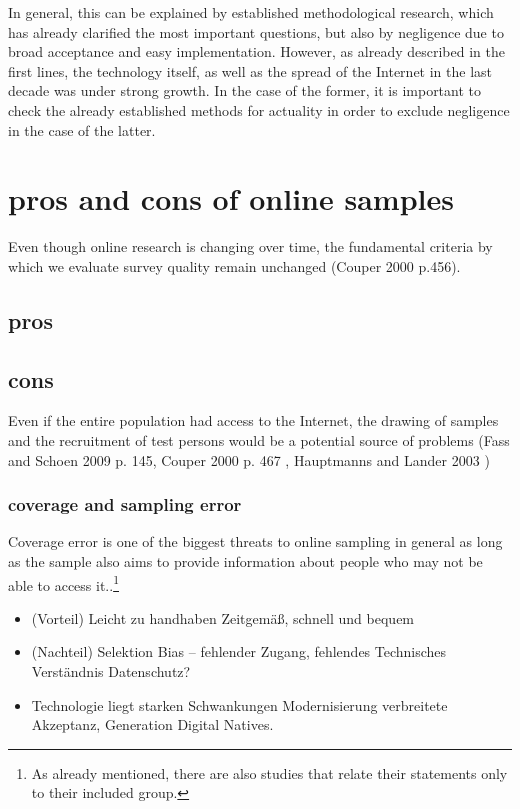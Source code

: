 \documentclass[a4paper , 11pt]{article}
\begin{document}
In general, this can be explained by established methodological research, which has already clarified the most important questions, but also by negligence due to broad acceptance and easy implementation.
However, as already described in the first lines, the technology itself, as well as the spread of the Internet in the last decade was under strong growth. In the case of the former, it is important to check the already established methods for actuality in order to exclude negligence in the case of the latter. 

\section{pros and cons of online samples}

Even though online research is changing over time, the fundamental criteria by which we evaluate survey quality remain unchanged (Couper 2000 p.456).

\subsection{pros}

\subsection{cons}
Even if the entire population had access to the Internet, the drawing of samples and the recruitment of test persons would be a potential source of problems (Fass and Schoen 2009 p. 145, Couper 2000 p. 467 , Hauptmanns and Lander 2003 )
\subsubsection{coverage and sampling error}
Coverage error is one of the biggest threats to online sampling in general as long as the sample also aims to provide information about people who may not be able to access it..\footnote{As already mentioned, there are also studies that relate their statements only to their included group.}

\begin{itemize}

\item (Vorteil) Leicht zu handhaben Zeitgemäß, schnell und bequem
\item (Nachteil) Selektion Bias – fehlender Zugang, fehlendes Technisches Verständnis Datenschutz?
\item Technologie liegt starken Schwankungen Modernisierung verbreitete Akzeptanz, Generation Digital Natives.
\end{itemize}
\end{document}
